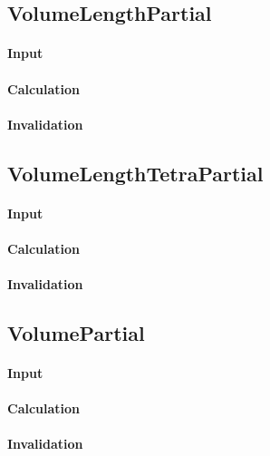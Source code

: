 \subsection{VolumeLengthPartial}

\paragraph{Input}

\paragraph{Calculation}

\paragraph{Invalidation}

\bigskip

\subsection{VolumeLengthTetraPartial}

\paragraph{Input}

\paragraph{Calculation}

\paragraph{Invalidation}

\bigskip

\subsection{VolumePartial}

\paragraph{Input}

\paragraph{Calculation}

\paragraph{Invalidation}

